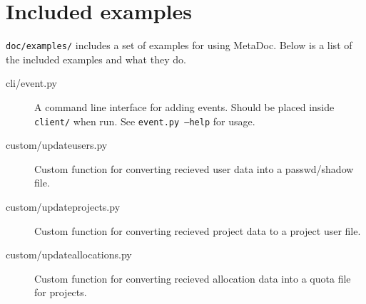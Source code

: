 \newpage
\section{Included examples}
\texttt{doc/examples/} includes a set of examples for using MetaDoc. Below is a
list of the included examples and what they do. 

\begin{description}
    \item[cli/event.py] A command line interface for adding events. Should be
    placed inside \texttt{client/} when run. See \texttt{event.py --help} for
    usage.
    \item[custom/updateusers.py]    Custom function for converting recieved
    user data into a passwd/shadow file.
    \item[custom/updateprojects.py] Custom function for converting recieved
    project data to a project user file.
    \item[custom/updateallocations.py]  Custom function for converting recieved
    allocation data into a quota file for projects.
\end{description}
